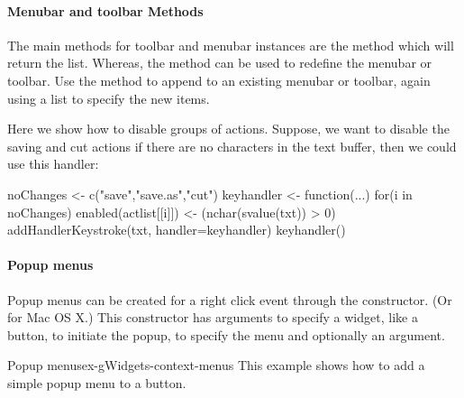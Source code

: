 \paragraph{Menubar and toolbar Methods}
The main methods for toolbar and menubar instances are
the  method which will return the list. Whereas, the
 method can be used to redefine the
menubar or toolbar. Use the  method to append to an
existing menubar or toolbar, again using a list to specify the new items.


Here we show how to disable groups of actions. Suppose, we want to
disable the saving and cut actions if there are no characters in the
text buffer, then we could use this handler:

\begin{Schunk}
\begin{Sinput}
 noChanges <- c("save","save.as","cut")
 keyhandler <- function(...) {
   for(i in noChanges)
     enabled(actlist[[i]]) <- (nchar(svalue(txt)) > 0)
 }
 addHandlerKeystroke(txt, handler=keyhandler)
 keyhandler()
\end{Sinput}
\end{Schunk}


\paragraph{Popup menus}

Popup menus can be created for a right click event through the
 constructor. (Or
 for Mac OS X.) This constructor has arguments
 to specify a widget, like a button, to initiate the popup,
 to specify the menu and optionally an
 argument.


\begin{example}{Popup menus}{ex-gWidgets-context-menus}
  This example shows how to add a simple popup menu to a button.
\begin{Schunk}
\end{Schunk}

\end{example}












